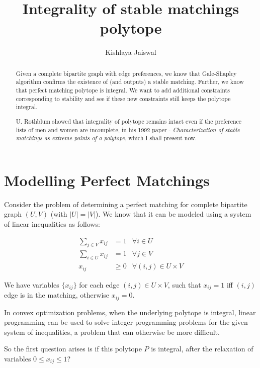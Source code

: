 \documentclass[a4paper,UKenglish,cleveref, autoref]{lipics-v2019}
\title{Integrality of stable matchings polytope} %
\author{Kishlaya Jaiswal}{Chennai Mathematical Institute }{kishlaya@cmi.ac.in}{}{}%
\theoremstyle{definition}
\begin{document}
\maketitle

\begin{abstract}
Given a complete bipartite graph with edge preferences, we know that Gale-Shapley algorithm confirms the existence of (and outputs) a stable matching. Further, we know that perfect matching polytope is integral. We want to add additional constraints corresponding to stability and see if these new constraints still keeps the polytope integral.

U. Rothblum showed that integrality of polytope remains intact even if the preference lists of men and women are incomplete, in his 1992 paper - \textsl{Characterization of stable matchings as extreme points of a polytope}, which I shall present now.
\end{abstract}

\section{Modelling Perfect Matchings}
\label{sec:typesetting-summary}

Consider the problem of determining a perfect matching for complete bipartite graph $(U,V)$ (with $|U|=|V|$). We know that it can be modeled using a system of linear inequalities as follows:

\begin{align}
    \sum_{j \in V} x_{ij} &= 1 & \forall i \in U \\
    \sum_{i \in U} x_{ij} &= 1 & \forall j \in V \\
    x_{ij} &\geq 0 & \forall (i,j) \in U \times V
\end{align}

We have variables $\{x_{ij}\}$ for each edge $(i,j) \in U \times V$, such that $x_{ij} = 1$ iff $(i,j)$ edge is in the matching, otherwise $x_{ij}=0$.

\begin{remark*}
In convex optimization problems, when the underlying polytope is integral, linear programming can be used to solve integer programming problems for the given system of inequalities, a problem that can otherwise be more difficult.
\end{remark*}

So the first question arises is if this polytope $P$ is integral, after the relaxation of variables $0 \leq x_{ij} \leq 1$?
\end{document}
